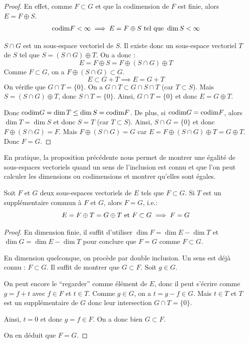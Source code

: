 \documentclass[11pt,a4paper]{report}
\begin{document}
\begin{proof}
    En effet, comme $F \subset G$ et que la codimension de $F$ est finie, alors $E = F \oplus S$.
    $$\mathrm{codim} F < \infty \implies E = F \oplus S \text{ tel que } \dim S < \infty$$

    $S \cap G$ est un sous-espace vectoriel de $S$. Il existe donc un sous-espace vectoriel $T$ de $S$ tel que $S = (S \cap G) \oplus T$. On a donc :
    $$E = F \oplus S = F \oplus (S \cap G) \oplus T$$
    Comme $F \subset G$, on a $F \oplus (S \cap G) \subset G$.
    $$E \subset G + T \implies E = G + T$$
    On vérifie que $G \cap T = \{0\}$. On a $G \cap T \subset G \cap S \cap T$ (car $T \subset S$). Mais $S = (S \cap G) \oplus T$, donc $S \cap T = \{0\}$. Ainsi, $G \cap T = \{0\}$ et donc $E = G \oplus T$.

    Donc $\mathrm{codim} G = \dim T \le \dim S = \mathrm{codim} F$. De plus, si $\mathrm{codim} G = \mathrm{codim} F$, alors $\dim T = \dim S$ et donc $S = T$ (car $T \subset S$). Ainsi, $S \cap G = \{0\}$ et donc $F \oplus (S \cap G) = F$. Mais $F \oplus (S \cap G) = G$ car $E = F \oplus (S \cap G) \oplus T = G \oplus T$. Donc $F = G$.
\end{proof}

\begin{methodbox}
    En pratique, la proposition précédente nous permet de montrer une égalité de sous-espaces vectoriels quand un sens de l'inclusion est connu et que l'on peut calculer les dimensions ou codimensions et montrer qu'elles sont égales.
\end{methodbox}


\begin{property}
    Soit $F$ et $G$ deux sous-espaces vectoriels de $E$ tels que $F \subset G$. Si $T$ est un supplémentaire commun à $F$ et $G$, alors $F = G$, i.e.:
    $$E = F \oplus T = G \oplus T \text{ et } F \subset G \implies F = G$$
\end{property}

\begin{proof}
    En dimension finie, il suffit d'utiliser $\dim F = \dim E - \dim T$ et $\dim G = \dim E - \dim T$ pour conclure que $F = G$ comme $F \subset G$.

    En dimension quelconque, on procède par double inclusion. Un sens est déjà connu : $F \subset G$. Il suffit de montrer que $G \subset F$. Soit $g \in G$.
    
    On peut encore le ``regarder'' comme élément de $E$, donc il peut s'écrire comme $g = f + t$ avec $f \in F$ et $t \in T$. Comme $g \in G$, on a $t = g - f \in G$. Mais $t \in T$ et $T$ est un supplémentaire de $G$ donc leur intersection $G \cap T = \{0\}$.
    
    Ainsi, $t = 0$ et donc $g = f \in F$. On a donc bien $G \subset F$.

    On en déduit que $F = G$.
\end{proof}
\end{document}

